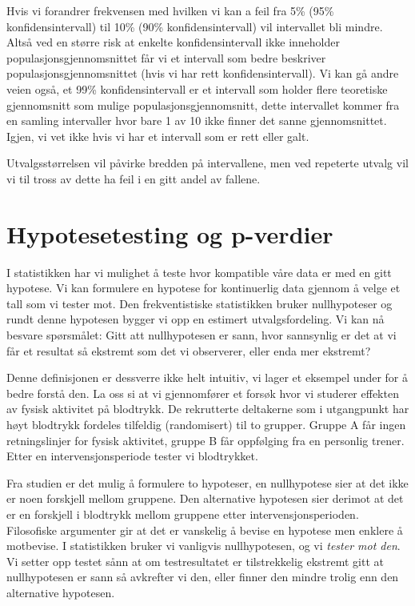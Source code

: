 \documentclass[
  letterpaper,
  DIV=11,
  numbers=noendperiod,
  oneside]{scrreprt}
\begin{document}
Hvis vi forandrer frekvensen med hvilken vi kan a feil fra 5\% (95\%
konfidensintervall) til 10\% (90\% konfidensintervall) vil intervallet
bli mindre. Altså ved en større risk at enkelte konfidensintervall ikke
inneholder populasjonsgjennomsnittet får vi et intervall som bedre
beskriver populasjonsgjennomsnittet (hvis vi har rett
konfidensintervall). Vi kan gå andre veien også, et 99\%
konfidensintervall er et intervall som holder flere teoretiske
gjennomsnitt som mulige populasjonsgjennomsnitt, dette intervallet
kommer fra en samling intervaller hvor bare 1 av 10 ikke finner det
sanne gjennomsnittet. Igjen, vi vet ikke hvis vi har et intervall som er
rett eller galt.

Utvalgsstørrelsen vil påvirke bredden på intervallene, men ved repeterte
utvalg vil vi til tross av dette ha feil i en gitt andel av fallene.

\hypertarget{hypotesetesting-og-p-verdier}{%
\section{Hypotesetesting og
p-verdier}\label{hypotesetesting-og-p-verdier}}

I statistikken har vi mulighet å teste hvor kompatible våre data er med
en gitt hypotese. Vi kan formulere en hypotese for kontinuerlig data
gjennom å velge et tall som vi tester mot. Den frekventistiske
statistikken bruker nullhypoteser og rundt denne hypotesen bygger vi opp
en estimert utvalgsfordeling. Vi kan nå besvare spørsmålet: Gitt att
nullhypotesen er sann, hvor sannsynlig er det at vi får et resultat så
ekstremt som det vi observerer, eller enda mer ekstremt?

Denne definisjonen er dessverre ikke helt intuitiv, vi lager et eksempel
under for å bedre forstå den. La oss si at vi gjennomfører et forsøk
hvor vi studerer effekten av fysisk aktivitet på blodtrykk. De
rekrutterte deltakerne som i utgangpunkt har høyt blodtrykk fordeles
tilfeldig (randomisert) til to grupper. Gruppe A får ingen
retningslinjer for fysisk aktivitet, gruppe B får oppfølging fra en
personlig trener. Etter en intervensjonsperiode tester vi blodtrykket.

Fra studien er det mulig å formulere to hypoteser, en nullhypotese sier
at det ikke er noen forskjell mellom gruppene. Den alternative hypotesen
sier derimot at det er en forskjell i blodtrykk mellom gruppene etter
intervensjonsperioden. Filosofiske argumenter gir at det er vanskelig å
bevise en hypotese men enklere å motbevise. I statistikken bruker vi
vanligvis nullhypotesen, og vi \emph{tester mot den}. Vi setter opp
testet sånn at om testresultatet er tilstrekkelig ekstremt gitt at
nullhypotesen er sann så avkrefter vi den, eller finner den mindre
trolig enn den alternative hypotesen.
\end{document}

